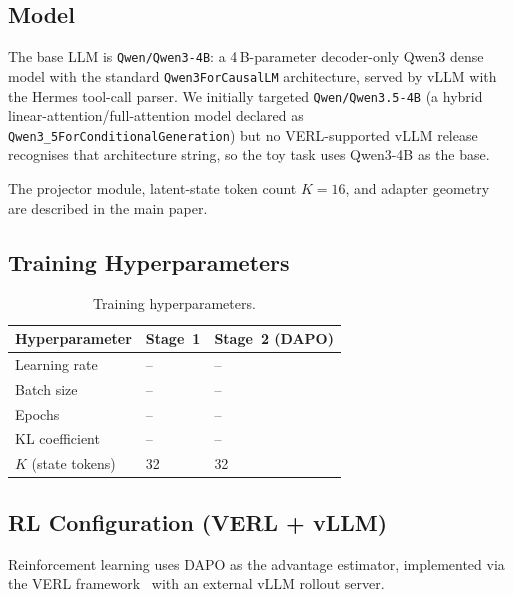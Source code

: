 \subsection{Model}
\label{app:details:model}

The base LLM is \texttt{Qwen/Qwen3-4B}: a 4\,B-parameter decoder-only Qwen3
dense model with the standard \texttt{Qwen3ForCausalLM} architecture,
served by vLLM with the Hermes tool-call parser. We initially targeted
\texttt{Qwen/Qwen3.5-4B} (a hybrid linear-attention/full-attention model
declared as \texttt{Qwen3\_5ForConditionalGeneration}) but no
VERL-supported vLLM release recognises that architecture string, so the
toy task uses Qwen3-4B as the base.

The projector module, latent-state token count $K{=}16$, and adapter
geometry are described in the main paper.

\subsection{Training Hyperparameters}
\label{app:details:hparams}

\begin{table}[h]
\centering
\small
\begin{tabular}{lll}
\toprule
\textbf{Hyperparameter} & \textbf{Stage~1} & \textbf{Stage~2 (DAPO)} \\
\midrule
Learning rate & -- & -- \\
Batch size & -- & -- \\
Epochs & -- & -- \\
KL coefficient & -- & -- \\
$K$ (state tokens) & 32 & 32 \\
\bottomrule
\end{tabular}
\caption{Training hyperparameters.}
\label{tab:hparams}
\end{table}

\subsection{RL Configuration (VERL + vLLM)}
\label{app:details:rl}

Reinforcement learning uses DAPO as the advantage estimator, implemented via the VERL framework~\cite{} with an external vLLM rollout server.

